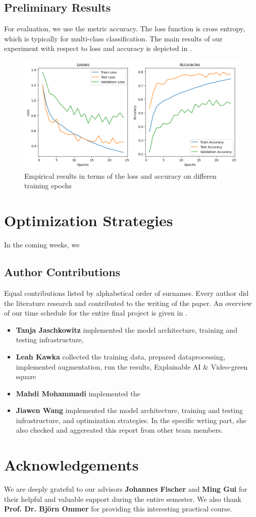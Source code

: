 \subsection{Preliminary Results}

For evaluation, we use the metric accuracy. 
The loss function is cross entropy, which is typically for multi-class classification. 
The main results of our experiment with respect to loss and accuracy is depicted in .

\begin{figure}[t]
  \centering
   \includegraphics[width=0.95\linewidth]{output.png}
   \caption{Empirical results in terms of the loss and accuracy on differen training epochs}
   \label{fig:result}
\end{figure}

\section{Optimization Strategies}
In the coming weeks, 
we 

\subsection*{Author Contributions}
\label{sec:author}
Equal contributions listed by alphabetical order of surnames. 
Every author did the literature research and contributed to the writing of the paper. 
An overview of our time schedule for the entire final project is given in . 

\begin{itemize}
  \item \textbf{Tanja Jaschkowitz} implemented the model architecture, training and testing infrastructure, 
  \item \textbf{Leah Kawka} collected the training data, prepared dataprocessing, implemented augmentation, run the results, 
  Explainable AI \& Video-green square
  \item \textbf{Mahdi Mohammadi} implemented the 
  \item \textbf{Jiawen Wang} implemented the model architecture, training and testing infrastructure, and optimization strategies. 
  In the specific wrting part, she also checked and aggereated this report from other team members.
\end{itemize}

\section*{Acknowledgements}

We are deeply grateful to our advisors \textbf{Johannes Fischer} and \textbf{Ming Gui} for their helpful and valuable support during the entire semester. 
We also thank \textbf{Prof. Dr. Björn Ommer} for providing this interesting practical course.
